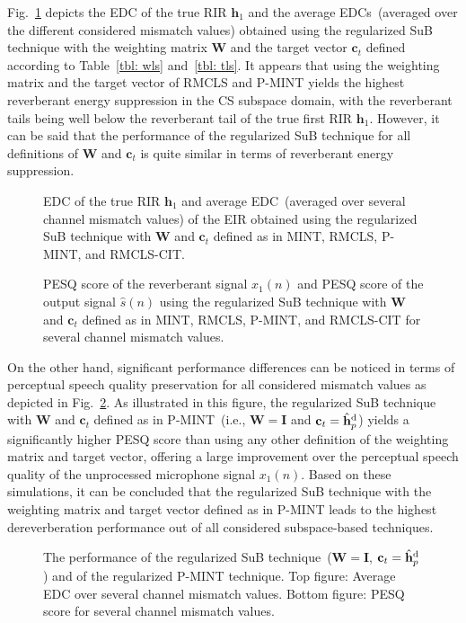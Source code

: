 \documentclass[11pt,draftcls,onecolumn]{IEEEtran}
\begin{document}
Fig.~\ref{fig: edc} depicts the EDC of the true RIR $\mathbf{h}_1$ and the average EDCs~(averaged over the different considered mismatch values) obtained using the regularized SuB technique with the weighting matrix $\mathbf{W}$ and the target vector $\mathbf{c}_t$ defined according to Table~\ref{tbl: wls} and~\ref{tbl: tls}.
It appears that using the weighting matrix and the target vector of RMCLS and P-MINT yields the highest reverberant energy suppression in the CS subspace domain, with the reverberant tails being well below the reverberant tail of the true first RIR $\mathbf{h}_1$.
However, it can be said that the performance of the regularized SuB technique for all definitions of $\mathbf{W}$ and $\mathbf{c}_t$ is quite similar in terms of reverberant energy suppression.
\begin{figure}[b!]
  \centering
  
  \caption{EDC of the true RIR $\mathbf{h}_1$ and average EDC~(averaged over several channel mismatch values) of the EIR obtained using the regularized SuB technique with $\mathbf{W}$ and $\mathbf{c}_t$ defined as in MINT, RMCLS, P-MINT, and RMCLS-CIT.}
  \label{fig: edc}
\end{figure}
\begin{figure}[t!]
  \centering
  
\caption{PESQ score of the reverberant signal $x_1(n)$ and PESQ score of the output signal $\hat{s}(n)$ using the regularized SuB technique with $\mathbf{W}$ and $\mathbf{c}_t$ defined as in MINT, RMCLS, P-MINT, and RMCLS-CIT for several channel mismatch values.}
\label{fig: pesq}
\end{figure}
On the other hand, significant performance differences can be noticed in terms of perceptual speech quality preservation for all considered mismatch values as depicted in Fig.~\ref{fig: pesq}.
As illustrated in this figure, the regularized SuB technique with $\mathbf{W}$ and $\mathbf{c}_t$ defined as in P-MINT~(i.e., $\mathbf{W} = \mathbf{I}$ and $\mathbf{c}_t = \hat{\mathbf{h}}_p^{\rm d}$) yields a significantly higher PESQ score than using any other definition of the weighting matrix and target vector, offering a large improvement over the perceptual speech quality of the unprocessed microphone signal $x_1(n)$.
Based on these simulations, it can be concluded that the regularized SuB technique with the weighting matrix and target vector defined as in P-MINT leads to the highest dereverberation performance out of all considered subspace-based techniques.
\begin{figure}[b!]
  \centering
  
  \caption{The performance of the regularized SuB technique~($\mathbf{W} =\mathbf{I}$, $\mathbf{c}_t = \hat{\mathbf{h}}_p^{\rm d}$) and of the regularized P-MINT technique. Top figure: Average EDC over several channel mismatch values. Bottom figure: PESQ score for several channel mismatch values.}
  \label{fig: all}
\end{figure}
\end{document}

